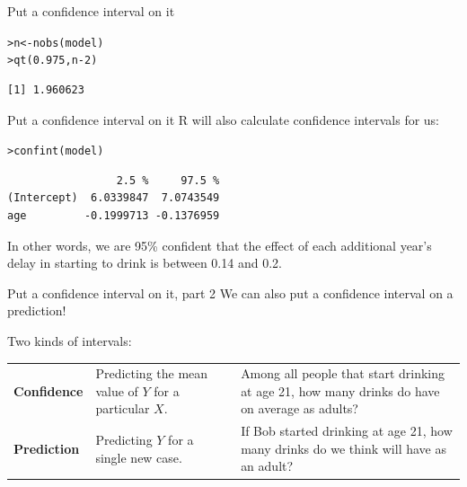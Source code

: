 \documentclass{beamer}\usepackage[]{graphicx}\usepackage[]{color}
\makeatletter
\newcommand{\hlnum}[1]{\textcolor[rgb]{0.824,0.412,0.118}{#1}}%
\newcommand{\hlopt}[1]{\textcolor[rgb]{1,0.894,0.769}{#1}}%
\newcommand{\hlstd}[1]{\textcolor[rgb]{1,0.894,0.769}{#1}}%
\newcommand{\hlkwb}[1]{\textcolor[rgb]{0.804,0.776,0.451}{#1}}%
\newcommand{\hlkwd}[1]{\textcolor[rgb]{1,0.78,0.769}{#1}}%
\newenvironment{kframe}{%
 \def\at@end@of@kframe{}%
 \ifinner\ifhmode%
  \def\at@end@of@kframe{\end{minipage}}%
  \begin{minipage}{\columnwidth}%
 \fi\fi%
 \def\FrameCommand##1{\hskip\@totalleftmargin \hskip-\fboxsep
 \colorbox{shadecolor}{##1}\hskip-\fboxsep
     \hskip-\linewidth \hskip-\@totalleftmargin \hskip\columnwidth}%
 \MakeFramed {\advance\hsize-\width
   \@totalleftmargin\z@ \linewidth\hsize
   \@setminipage}}%
 {\par\unskip\endMakeFramed%
 \at@end@of@kframe}
\newenvironment{knitrout}{}{} %
\makeatother
\begin{document}
\begin{darkframes}
\begin{frame}[fragile]{Put a confidence interval on it}
\begin{knitrout}
\begin{kframe}
\begin{alltt}
\hlstd{> }\hlstd{n} \hlkwb{<-} \hlkwd{nobs}\hlstd{(model)}
\hlstd{> }\hlkwd{qt}\hlstd{(}\hlnum{0.975}\hlstd{, n}\hlopt{-}\hlnum{2}\hlstd{)}
\end{alltt}
\begin{verbatim}
[1] 1.960623
\end{verbatim}
\end{kframe}
\end{knitrout}
    \end{frame}

    \begin{frame}[fragile]{Put a confidence interval on it}
      R will also calculate confidence intervals for us:
\begin{knitrout}
\begin{kframe}
\begin{alltt}
\hlstd{> }\hlkwd{confint}\hlstd{(model)}
\end{alltt}
\begin{verbatim}
                 2.5 %     97.5 %
(Intercept)  6.0339847  7.0743549
age         -0.1999713 -0.1376959
\end{verbatim}
\end{kframe}
\end{knitrout}

      \pause
      In other words, we are 95\% confident that the effect of each additional year's delay in starting to drink is between 0.14 and 0.2.
    \end{frame}

    \begin{frame}{Put a confidence interval on it, part 2}
      We can also put a confidence interval on a prediction!

      Two kinds of intervals:
      \bigskip

      \begin{tabular}{lp{1in}p{2in}}
        \textbf{Confidence} & Predicting the mean value of $Y$ for a particular $X$. & Among all people that start drinking at age 21, how many drinks do have on average as adults? \\
        \textbf{Prediction} & Predicting $Y$ for a single new case. & If Bob started drinking at age 21, how many drinks do we think will have as an adult? \\
      \end{tabular}
    \end{frame}


\end{darkframes}
\end{document}
